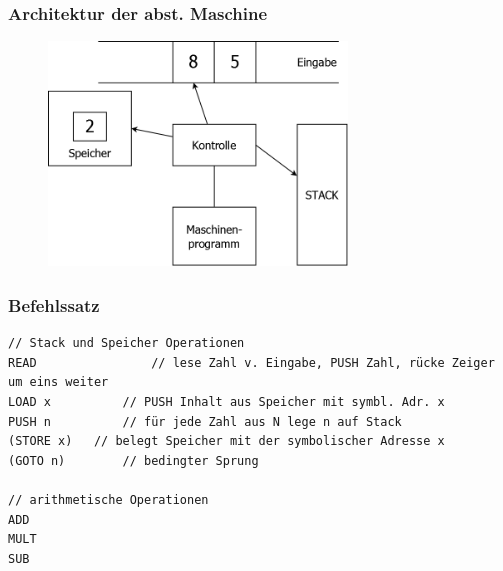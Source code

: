 \subsubsection*{Architektur der abst. Maschine}
\begin{figure}[h]
	\centering
	\includegraphics[width=300px]{../gfx/architecture.png}
\end{figure}

\subsubsection*{Befehlssatz}
\begin{lstlisting}
// Stack und Speicher Operationen
READ 				// lese Zahl v. Eingabe, PUSH Zahl, rücke Zeiger um eins weiter
LOAD x			// PUSH Inhalt aus Speicher mit symbl. Adr. x
PUSH n			// für jede Zahl aus N lege n auf Stack
(STORE x) 	// belegt Speicher mit der symbolischer Adresse x 
(GOTO n) 		// bedingter Sprung

// arithmetische Operationen
ADD
MULT
SUB
\end{lstlisting}




